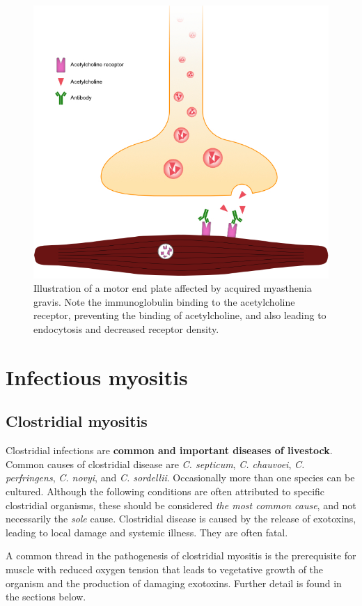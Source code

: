 \documentclass[openany]{book}
\begin{document}
\begin{figure}

{\centering \includegraphics[width=0.5\linewidth]{images/acq-myasthenia} 

}

\caption{Illustration of a motor end plate affected by acquired myasthenia gravis. Note the immunoglobulin binding to the acetylcholine receptor, preventing the binding of acetylcholine, and also leading to endocytosis and decreased receptor density.}\label{fig:acq-myasthenia}
\end{figure}

\chapter{Infectious myositis}\label{infectious-myositis}

\section{Clostridial myositis}\label{clostridial-myositis}

Clostridial infections are \textbf{common and important diseases of
livestock}. Common causes of clostridial disease are \emph{C. septicum},
\emph{C. chauvoei}, \emph{C. perfringens}, \emph{C. novyi}, and \emph{C.
sordellii}. Occasionally more than one species can be cultured. Although
the following conditions are often attributed to specific clostridial
organisms, these should be considered \emph{the most common cause}, and
not necessarily the \emph{sole} cause. Clostridial disease is caused by
the release of exotoxins, leading to local damage and systemic illness.
They are often fatal.

A common thread in the pathogenesis of clostridial myositis is the
prerequisite for muscle with reduced oxygen tension that leads to
vegetative growth of the organism and the production of damaging
exotoxins. Further detail is found in the sections below.
\end{document}

